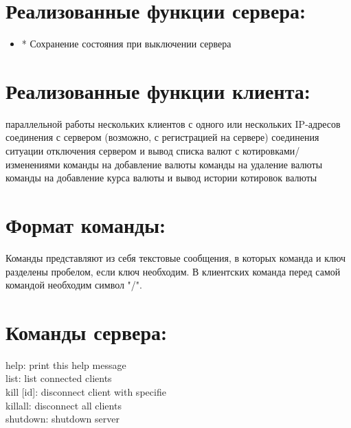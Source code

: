 \documentclass[10pt,a4paper,oneside]{article}
\begin{document}
\section{Реализованные функции сервера:}

\begin{itemize}
 определенного порта 
 запросов на подключение по этому порту клиентов 
 одновременной работы нескольких клиентов с использованием механизма нитей и средств синхронизации доступа к разделяемым между нитями ресурсам. 
 отключение конкретного клиента 
 новой валюты (кода валюты) 
 валюты 
 курса конкретной валюты 
 пользователю списка имеющихся валют с текущими курсами и абсолютными/относительными приращениями к предыдущим значениям 
 пользователю истории курса конкретной валюты 
\item* Сохранение состояния при выключении сервера
\end{itemize}


\section{Реализованные функции клиента:}


\begin{itemize}
 параллельной работы нескольких клиентов с одного или нескольких IP-адресов 
 соединения с сервером (возможно, с регистрацией на сервере)
 соединения 
 ситуации отключения сервером 
 и вывод списка валют с котировками/изменениями 
 команды на добавление валюты 
 команды на удаление валюты 
 команды на добавление курса валюты 
 и вывод истории котировок валюты 
\end{itemize}
\newpage

\section{Формат команды:}

Команды представляют из себя текстовые сообщения, в которых команда и ключ разделены пробелом, если ключ необходим. В клиентских команда перед самой командой необходим символ "/".\\


\section{Команды сервера:}
help: print this help message\\
list: list connected clients\\
kill [id]: disconnect client with specifie\\
killall: disconnect all clients\\
shutdown: shutdown server\\
\end{document}
